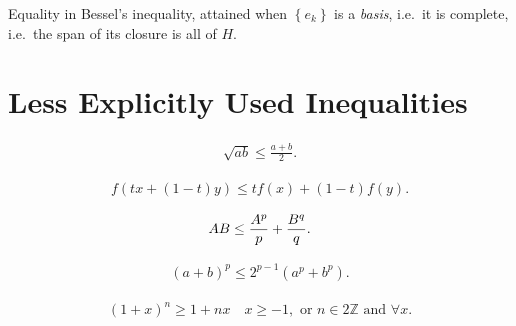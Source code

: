 \begin{proposition}

Equality in Bessel's inequality, attained when \(\left\{{e_k}\right\}\)
is a \emph{basis}, i.e.~it is complete, i.e.~the span of its closure is
all of \(H\).

\end{proposition}

\hypertarget{less-explicitly-used-inequalities}{%
\section{Less Explicitly Used
Inequalities}\label{less-explicitly-used-inequalities}}

\begin{proposition}[AM-GM Inequality]

\begin{align*}
\sqrt{ab} \leq \frac{a+b}{2}
.\end{align*}

\end{proposition}

\begin{proposition}

\begin{align*}
f(tx + (1-t)y) \leq tf(x) + (1-t)f(y)
.\end{align*}

\end{proposition}

\begin{proposition}

\begin{align*}
AB \leq {A^p \over p} + {B^q \over q}
.\end{align*}

\end{proposition}

\begin{proposition}[?]

\begin{align*}
(a+b)^p \leq 2^{p-1} (a^p + b^p)
.\end{align*}

\end{proposition}

\begin{proposition}

\begin{align*}
(1 + x)^n \geq 1 +nx \quad x\geq -1, \text{ or } n\in 2{\mathbb{Z}}\text{ and } \forall x
.\end{align*}

\end{proposition}

